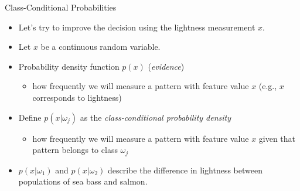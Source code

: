 \begin{frame}{Class-Conditional Probabilities}
\begin{itemize}
\item Let's try to improve the decision using the lightness
measurement $x$.
\item Let $x$ be a continuous random variable.
\item Probability density function $p(x)$ (\textit{\color{mycolor1}evidence})
\begin{itemize}
\item how frequently we will measure a pattern with feature value $x$ (e.g., $x$ corresponds to lightness)
\end{itemize}
\item Define $p(x|\omega_j )$ as the \textit{\color{mycolor1}class-conditional probability density}
\begin{itemize}
\item how frequently we will measure a pattern with feature value $x$ given that pattern belongs to class $\omega_j$
\end{itemize}
\item $p(x|\omega_1)$ and $p(x|\omega_2)$ describe the difference in lightness
between populations of sea bass and salmon.
\end{itemize}
\end{frame}
%

